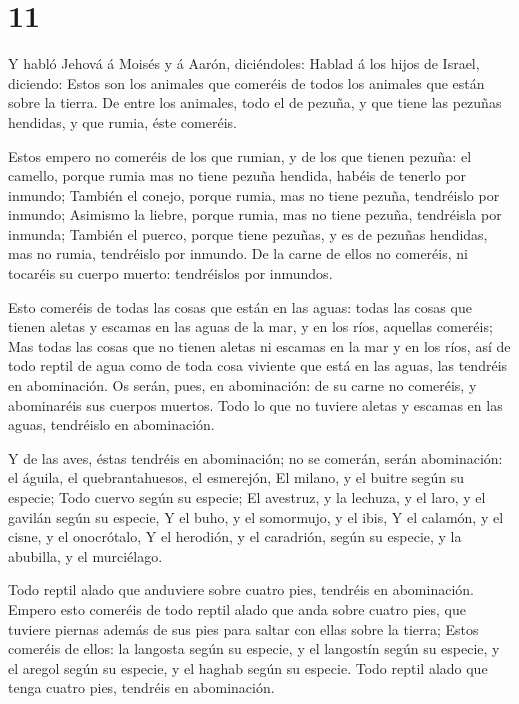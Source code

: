 \hypertarget{section-10}{%
\section{11}\label{section-10}}

 Y habló Jehová á Moisés y á Aarón, diciéndoles:
 Hablad á los hijos de Israel, diciendo: Estos son los
animales que comeréis de todos los animales que están sobre la tierra.
 De entre los animales, todo el de pezuña, y que tiene las
pezuñas hendidas, y que rumia, éste comeréis.

 Estos empero no comeréis de los que rumian, y de los que
tienen pezuña: el camello, porque rumia mas no tiene pezuña hendida,
habéis de tenerlo por inmundo;  También el conejo, porque
rumia, mas no tiene pezuña, tendréislo por inmundo; 
Asimismo la liebre, porque rumia, mas no tiene pezuña, tendréisla por
inmunda;  También el puerco, porque tiene pezuñas, y es de
pezuñas hendidas, mas no rumia, tendréislo por inmundo.  De
la carne de ellos no comeréis, ni tocaréis su cuerpo muerto: tendréislos
por inmundos.

 Esto comeréis de todas las cosas que están en las aguas:
todas las cosas que tienen aletas y escamas en las aguas de la mar, y en
los ríos, aquellas comeréis;  Mas todas las cosas que no
tienen aletas ni escamas en la mar y en los ríos, así de todo reptil de
agua como de toda cosa viviente que está en las aguas, las tendréis en
abominación.  Os serán, pues, en abominación: de su carne
no comeréis, y abominaréis sus cuerpos muertos.  Todo lo
que no tuviere aletas y escamas en las aguas, tendréislo en abominación.

 Y de las aves, éstas tendréis en abominación; no se
comerán, serán abominación: el águila, el quebrantahuesos, el esmerejón,
 El milano, y el buitre según su especie; 
Todo cuervo según su especie;  El avestruz, y la lechuza, y
el laro, y el gavilán según su especie,  Y el buho, y el
somormujo, y el ibis,  Y el calamón, y el cisne, y el
onocrótalo,  Y el herodión, y el caradrión, según su
especie, y la abubilla, y el murciélago.

 Todo reptil alado que anduviere sobre cuatro pies,
tendréis en abominación.  Empero esto comeréis de todo
reptil alado que anda sobre cuatro pies, que tuviere piernas además de
sus pies para saltar con ellas sobre la tierra;  Estos
comeréis de ellos: la langosta según su especie, y el langostín según su
especie, y el aregol según su especie, y el haghab según su especie.
 Todo reptil alado que tenga cuatro pies, tendréis en
abominación.

